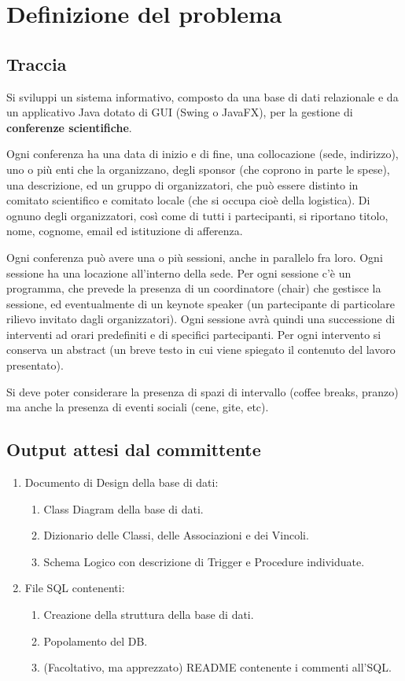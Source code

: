 \chapter{Definizione del problema}
\section{Traccia}\label{sez:traccia}
Si sviluppi un sistema informativo, composto da una base di dati relazionale e da un applicativo Java dotato
di GUI (Swing o JavaFX), per la gestione di \textbf{conferenze scientifiche}. 
\bigskip

Ogni conferenza ha una data di inizio e di fine, una collocazione (sede, indirizzo), uno o più enti che la organizzano, degli sponsor (che coprono in parte le spese), una descrizione, ed un gruppo di organizzatori, che può essere distinto in comitato scientifico e comitato locale (che si occupa cioè della logistica). Di ognuno degli organizzatori, così come di tutti i partecipanti, si riportano titolo, nome, cognome, email ed istituzione di afferenza. 
\bigskip

Ogni conferenza può avere una o più sessioni, anche in parallelo fra loro. Ogni sessione ha una locazione all'interno della sede. Per ogni
sessione c'è un programma, che prevede la presenza di un coordinatore (chair) che gestisce la sessione, ed eventualmente di un keynote speaker (un partecipante di particolare rilievo invitato dagli organizzatori). Ogni sessione avrà quindi una successione di interventi ad orari predefiniti e di specifici partecipanti. Per ogni intervento si conserva un abstract (un breve testo in cui viene spiegato il contenuto del lavoro presentato).
\bigskip

Si deve poter considerare la presenza di spazi di intervallo (coffee breaks, pranzo) ma anche la presenza di eventi sociali (cene, gite, etc).
\section{Output attesi dal committente}
\begin{enumerate}
\item Documento di Design della base di dati:
\begin{enumerate}
\item Class Diagram della base di dati.
\item Dizionario delle Classi, delle Associazioni e dei Vincoli.
\item Schema Logico con descrizione di Trigger e Procedure individuate.
\end{enumerate}
\item File SQL contenenti:
\begin{enumerate}
\item Creazione della struttura della base di dati.
\item Popolamento del DB.
\item (Facoltativo, ma apprezzato) README contenente i commenti all’SQL.
\end{enumerate}
\end{enumerate}